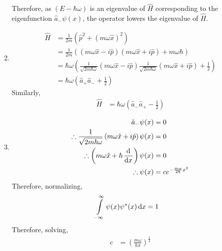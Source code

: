 \documentclass[fleqn, a4paper, 11pt, oneside]{amsart}
\theoremstyle{definition}
\theoremstyle{theorem}
\begin{document}
\begin{solution}
\begin{enumerate}[leftmargin=*]
			Therefore, as $(E - \hbar \omega)$ is an eigenvalue of $\hat{H}$ corresponding to the eigenfunction $\hat{a}_- \psi(x)$, the operator lowers the eigenvalue of $\hat{H}$.
		\item
			\begin{align*}
				\hat{H} & = \frac{1}{2 m} \left( {\hat{p}}^2 + \left( m \omega \hat{x} \right)^2 \right)                                                                                                                          \\
                                        & = \frac{1}{2 m} \left( \left( m \omega \hat{x} - i \hat{p} \right) \left( m \omega \hat{x} + i \hat{p} \right) + m \omega \hbar \right)                                                                 \\
                                        & = \hbar \omega \left( \frac{1}{\sqrt{2 m \hbar \omega}} \left( m \omega \hat{x} - i \hat{p} \right) \frac{1}{\sqrt{2 m \hbar \omega}} \left( m \omega \hat{x} + i \hat{p} \right) + \frac{1}{2} \right) \\
                                        & = \hbar \omega \left( \hat{a}_+ \hat{a}_- + \frac{1}{2} \right)
			\end{align*}
			Similarly,
			\begin{align*}
				\hat{H} & = \hbar \omega \left( \hat{a}_- \hat{a}_+ - \frac{1}{2} \right)
			\end{align*}
		\item
			\begin{align*}
				\hat{a}_- \psi(x)                                                                                & = 0 \\
				\therefore \frac{1}{\sqrt{2 m \hbar \omega}} \left( m \omega \hat{x} + i \hat{p} \right) \psi(x) & = 0 \\
				\therefore \left( m \omega \hat{x} + \hbar \dod{}{x} \right) \psi(x)                             & = 0 \\
				\therefore \psi(x)                                                                               & = c e^{-\frac{m \omega}{2 \hbar} x^2}
			\end{align*}
			Therefore, normalizing,
			\begin{align*}
				\int\limits_{-\infty}^{\infty} \psi(x) \psi^*(x) \dif x & = 1
			\end{align*}
			Therefore, solving,
			\begin{align*}
				c & = \left( \frac{m \omega}{\hbar \pi} \right)^{\frac{1}{4}}
			\end{align*}

\end{enumerate}
\end{solution}
\end{document}
